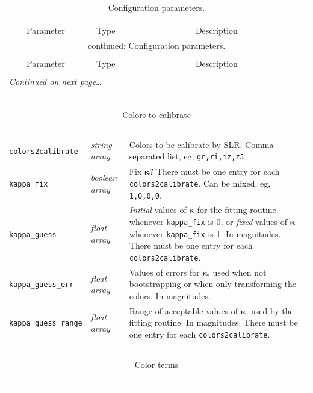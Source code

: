 \documentclass{report}
\newcommand{\zptcolor}{\boldsymbol{\kappa}}
\begin{document}
\begin{center}
\begin{longtable}{llp{2in}}
\caption[Configuration parameters.]{Configuration parameters.}
\label{tab:config} \\
  \hline \hline \\[-2ex]
  \multicolumn{1}{c}{Parameter} &
  \multicolumn{1}{c}{Type} &
  \multicolumn{1}{c}{Description} \\[0.5ex] \hline
\endfirsthead
\multicolumn{3}{c}{{\tablename} \thetable{} continued: Configuration parameters.} \\[0.5ex]
  \hline \hline \\[-2ex]
  \multicolumn{1}{c}{Parameter} &
  \multicolumn{1}{c}{Type} &
  \multicolumn{1}{c}{Description} 
\\[0.5ex] \hline
  \\[-1.8ex]
\endhead
\multicolumn{3}{l}{{{\it Continued on next page}\ldots}} \\
\endfoot
  \\[-1.8ex] \hline \hline
\endlastfoot

~ & ~ & ~ \\ \hline
\multicolumn{3}{c}{Colors to calibrate} \\
\hline ~ & ~ & ~ \\ 

\verb|colors2calibrate| & {\it string array} & Colors to be calibrate by SLR. Comma separated list, eg, \verb|gr,ri,iz,zJ| \\
\verb|kappa_fix| & {\it boolean array} & Fix $\zptcolor$? There must be one entry for each \verb|colors2calibrate|. Can be mixed, eg, \verb|1,0,0,0|. \\
\verb|kappa_guess| & {\it float array} & {\it Initial} values of $\zptcolor$ for the fitting routine whenever \verb|kappa_fix| is 0, or {\it fixed} values of $\mathbf{\kappa}$ whenever \verb|kappa_fix| is 1. In magnitudes. There must be one entry for each \verb|colors2calibrate|. \\
\verb|kappa_guess_err| & {\it float array} & Values of errors for $\zptcolor$, used when not bootstrapping or when only transforming the colors. In magnitudes. \\
\verb|kappa_guess_range| & {\it float array} & Range of acceptable values of $\zptcolor$, used by the fitting routine. In magnitudes. There must be one entry for each \verb|colors2calibrate|. \\

~ & ~ & ~ \\ \hline
\multicolumn{3}{c}{Color terms} \\
\hline ~ & ~ & ~ \\ 


\end{longtable}
\end{center}
\end{document}
